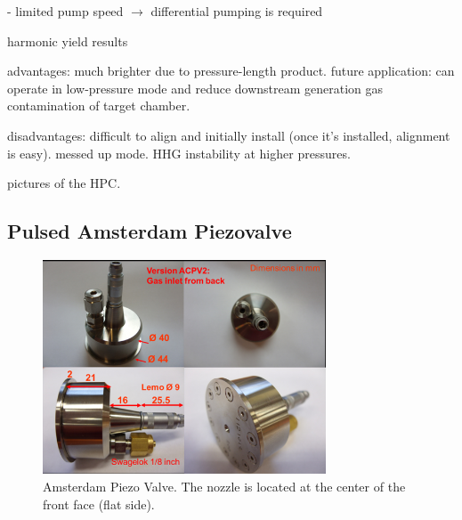 - limited pump speed $\rightarrow$ differential pumping is required


harmonic yield results

advantages: much brighter due to pressure-length product. future application: can operate in low-pressure mode and reduce downstream generation gas contamination of target chamber.

disadvantages: difficult to align and initially install (once it's installed, alignment is easy). messed up mode. HHG instability at higher pressures.

pictures of the HPC.



\subsection{Pulsed Amsterdam Piezovalve}

\begin{figure}
	\centering
	\includegraphics[width=0.75\textwidth]{figures/chap3/piezovalve_picture.png}
	\caption{Amsterdam Piezo Valve. The nozzle is located at the center of the front face (flat side).}
	\label{fig:piezovalve_picture}
\end{figure}


